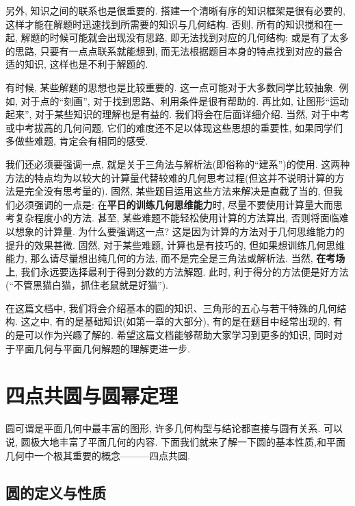 \documentclass{book}
\begin{document}
另外, 知识之间的联系也是很重要的. 搭建一个清晰有序的知识框架是很有必要的, 这样才能在解题时迅速找到所需要的知识与几何结构. 否则, 所有的知识搅和在一起, 解题的时候可能就会出现没有思路, 即无法找到对应的几何结构; 或是有了太多的思路, 只要有一点点联系就能想到, 而无法根据题目本身的特点找到对应的最合适的知识, 这样也是不利于解题的.\par
有时候, 某些解题的思想也是比较重要的. 这一点可能对于大多数同学比较抽象. 例如, 对于点的“刻画”, 对于找到思路、利用条件是很有帮助的. 再比如, 让图形“运动起来”, 对于某些知识的理解也是有益的. 我们将会在后面详细介绍. 当然, 对于中考或中考拔高的几何问题, 它们的难度还不足以体现这些思想的重要性, 如果同学们多做些难题, 肯定会有相同的感受.\par
我们还必须要强调一点, 就是关于三角法与解析法(即俗称的“建系”)的使用. 这两种方法的特点均为以较大的计算量代替较难的几何思考过程(但这并不说明计算的方法是完全没有思考量的). 固然, 某些题目运用这些方法来解决是直截了当的, 但我们必须强调的一点是: 在\textbf{平日的训练几何思维能力}时, 尽量不要使用计算量大而思考复杂程度小的方法. 甚至, 某些难题不能轻松使用计算的方法算出, 否则将面临难以想象的计算量. 为什么要强调这一点? 这是因为计算的方法对于几何思维能力的提升的效果甚微. 固然, 对于某些难题, 计算也是有技巧的, 但如果想训练几何思维能力, 那么请尽量想出纯几何的方法, 而不是完全是三角法或解析法. 当然, \textbf{在考场上}, 我们永远要选择最利于得到分数的方法解题. 此时, 利于得分的方法便是好方法(“不管黑猫白猫，抓住老鼠就是好猫”).\par
在这篇文档中, 我们将会介绍基本的圆的知识、三角形的五心与若干特殊的几何结构. 这之中, 有的是基础知识(如第一章的大部分), 有的是在题目中经常出现的, 有的是可以作为兴趣了解的. 希望这篇文档能够帮助大家学习到更多的知识, 同时对于平面几何与平面几何解题的理解更进一步.




\chapter{四点共圆与圆幂定理}
\thispagestyle{empty}

圆可谓是平面几何中最丰富的图形, 许多几何构型与结论都直接与圆有关系. 可以说, 圆极大地丰富了平面几何的内容. 下面我们就来了解一下圆的基本性质,和平面几何中一个极其重要的概念———四点共圆.

\section{圆的定义与性质}
\end{document}
